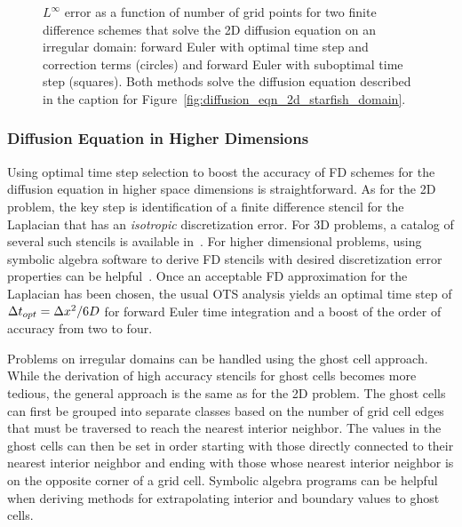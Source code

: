 \documentclass[oneeqnum,onefignum,onetabnum,onethmnum]{siamltex}
\begin{document}
\begin{figure}[htb]
\begin{center}
\caption{$L^\infty$ error as a function of number of grid points for two
finite difference schemes that solve the 2D diffusion equation on an 
irregular domain: forward Euler with optimal time step and correction 
terms (circles) and forward Euler with suboptimal time step (squares).
Both methods solve the diffusion equation described in the caption for
Figure~\ref{fig:diffusion_eqn_2d_starfish_domain}.
}
\label{fig:diffusion_eqn_2d_starfish_error}
\end{center}
\end{figure}


\subsubsection{Diffusion Equation in Higher Dimensions}
Using optimal time step selection to boost the accuracy of FD schemes for 
the diffusion equation in higher space dimensions is straightforward.  
As for the 2D problem, the key step is identification of a finite difference 
stencil for the Laplacian that has an \emph{isotropic} discretization error.
For 3D problems, a catalog of several such stencils is available 
in~\cite{patra_2005}.  For higher dimensional problems, using symbolic 
algebra software to derive FD stencils with desired discretization error 
properties can be helpful~\cite{patra_2005, gupta_1998}.  Once an acceptable
FD approximation for the Laplacian has been chosen, the usual OTS analysis 
yields an optimal time step of $\Delta t_{opt} = \Delta x^2/6D$ for forward Euler
time integration and a boost of the order of accuracy from two to four.

Problems on irregular domains can be handled using the ghost cell approach. 
While the derivation of high accuracy stencils for ghost cells becomes more
tedious, the general approach is the same as for the 2D problem.  The ghost 
cells can first be grouped into separate classes based on the number of 
grid cell edges that must be traversed to reach the nearest interior neighbor.
The values in the ghost cells can then be set in order starting with those 
directly connected to their nearest interior neighbor and ending with those 
whose nearest interior neighbor is on the opposite corner of a grid cell.
Symbolic algebra programs can be helpful when deriving methods for 
extrapolating interior and boundary values to ghost cells.
\end{document}
